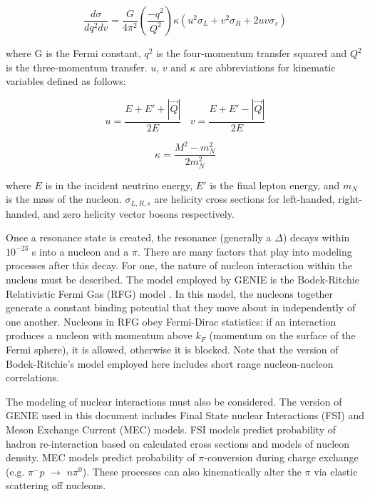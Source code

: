 \begin{equation}
  \frac{d\sigma}{dq^2dv} = \frac{G}{4\pi^2} (\frac{-q^2}{Q^2}) \kappa (u^2\sigma_L+v^2\sigma_R + 2uv\sigma_s)
\end{equation}

\noindent where G is the Fermi constant, $q^2$ is the four-momentum transfer squared and $Q^2$ is the three-momentum transfer. $u$, $v$ and $\kappa$ are abbreviations for kinematic variables defined as follows:

\begin{equation}
 u = \frac{E + E' + |\vec{Q}|}{2E}\ \ \ \  v = \frac{E + E' - |\vec{Q}|}{2E}
\end{equation}

\begin{equation}
 \kappa = \frac{M^2 - m_{N}^2}{2m_{N}^2}
\end{equation}

\noindent where $E$ is in the incident neutrino energy, $E'$ is the final lepton energy, and $m_N$ is the mass of the nucleon.  $\sigma_{L,R,s}$ are helicity cross sections for left-handed, right-handed, and zero helicity vector bosons respectively. 

\par  Once a resonance state is created, the resonance (generally a $\Delta$) decays within $10^{-23}$ s into a nucleon and a $\pi$.  There are many factors that play into modeling processes after this decay.  For one, the nature of nucleon interaction within the nucleus must be described. The model employed by GENIE is the Bodek-Ritchie Relativistic Fermi Gas (RFG) model \cite{bib:bodek_ritchie}.  In this model, the nucleons together generate a constant binding potential that they move about in independently of one another. Nucleons in RFG obey Fermi-Dirac statistics: if an interaction produces a nucleon with momentum above $k_F$ (momentum on the surface of the Fermi sphere), it is allowed, otherwise it is blocked. Note that the version of Bodek-Ritchie's model employed here includes short range nucleon-nucleon correlations. 

The modeling of nuclear interactions must also be considered. The version of GENIE used in this document includes Final State nuclear Interactions (FSI) and Meson Exchange Current (MEC) models. FSI models predict probability of hadron re-interaction based on calculated cross sections and models of nucleon density. MEC models predict probability of $\pi$-conversion during charge exchange (e.g. $\pi^- p$ $\rightarrow$ $n \pi^0$). These processes can also kinematically alter the $\pi$ via elastic scattering off nucleons.

